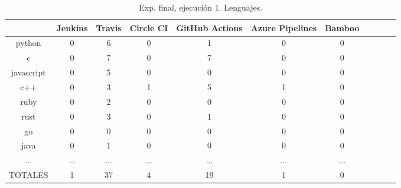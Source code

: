 \begin{table}[h]
  \centering
  \caption{Exp. final, ejecución 1. Lenguajes.}
  \label{tab:tabla_f1_6a}

\begin{footnotesize}
\renewcommand{\arraystretch}{1.5} %
\begin{tabular}{ccccccccccc}
  \hline
  {} &  Jenkins &  Travis &  Circle CI &  GitHub Actions &  Azure Pipelines &  Bamboo \\
  \hline
  python           &        0 &       6 &          0 &               1 &                0 &       0 \\
  c                &        0 &       7 &          0 &               7 &                0 &       0 \\
  javascript       &        0 &       5 &          0 &               0 &                0 &       0 \\
  c++              &        0 &       3 &          1 &               5 &                1 &       0 \\
  ruby             &        0 &       2 &          0 &               0 &                0 &       0 \\
  rust             &        0 &       3 &          0 &               1 &                0 &       0 \\
  go               &        0 &       0 &          0 &               0 &                0 &       0 \\
  java             &        0 &       1 &          0 &               0 &                0 &       0 \\
  ...              &      ... &     ... &        ... &             ... &              ... &     ... \\
  TOTALES          &        1 &      37 &          4 &              19 &                1 &       0 \\
 \end{tabular}
\end{footnotesize}

\end{table}


